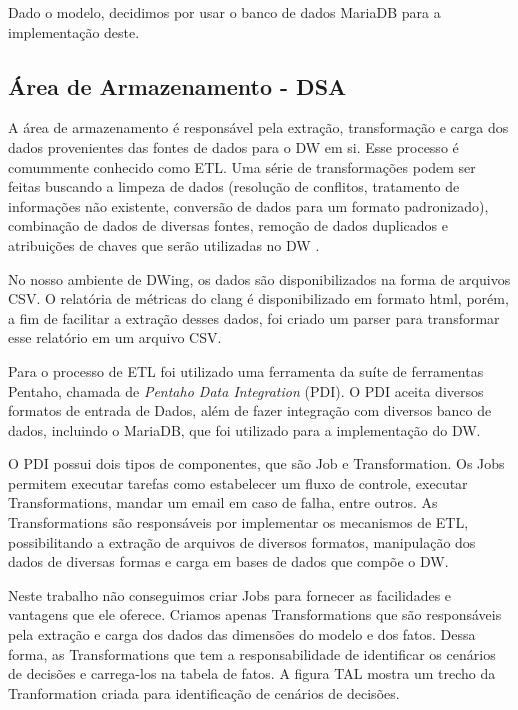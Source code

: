 Dado o modelo, decidimos por usar o banco de dados MariaDB para a implementação deste.



\subsection{Área de Armazenamento - DSA}

A área de armazenamento é responsável pela extração, transformação e carga dos dados provenientes das fontes de dados para o DW em si. Esse processo é comummente conhecido como ETL. Uma série de transformações podem ser feitas buscando a limpeza de dados (resolução de conflitos, tratamento de informações não existente, conversão de dados para um formato padronizado), combinação de dados de diversas fontes, remoção de dados duplicados e atribuições de chaves que serão utilizadas no DW \cite{kimball2002}.

%
No nosso ambiente de DWing, os dados são disponibilizados na forma de arquivos CSV. O relatória de métricas do clang é disponibilizado em formato html, porém, a fim de facilitar a extração desses dados, foi criado um parser para transformar esse relatório em um arquivo CSV.


Para o processo de ETL foi utilizado uma ferramenta da suíte de ferramentas Pentaho, chamada de \emph{Pentaho Data Integration} (PDI). O PDI aceita diversos formatos de entrada de Dados, além de fazer integração com diversos banco de dados, incluindo o MariaDB, que foi utilizado para a implementação do DW.


O PDI possui dois tipos de componentes, que são Job e Transformation. Os Jobs permitem executar tarefas como estabelecer um fluxo de controle, executar Transformations, mandar um email em caso de falha, entre outros. As Transformations são responsáveis por implementar os mecanismos de ETL, possibilitando a extração de arquivos de diversos formatos, manipulação dos dados de diversas formas e carga em bases de dados que compõe o DW.


Neste trabalho não conseguimos criar Jobs para fornecer as facilidades e vantagens que ele oferece. Criamos apenas Transformations que são responsáveis pela extração e carga dos dados das dimensões do modelo e dos fatos. Dessa forma, as Transformations que tem a responsabilidade de identificar os cenários de decisões e carrega-los na tabela de fatos. A figura TAL mostra um trecho da Tranformation criada para identificação de cenários de decisões.


